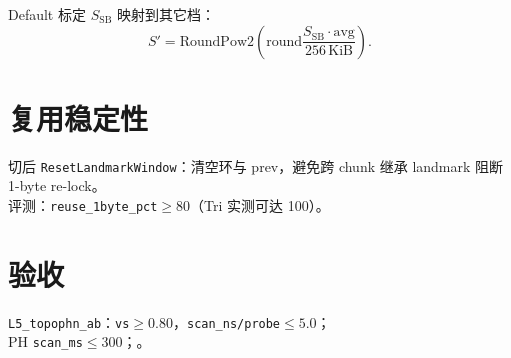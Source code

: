 Default 标定 $S_{\mathrm{SB}}$ 映射到其它档：
\begin{equation}
S'=\mathrm{RoundPow2}\!\left(\mathrm{round}\frac{S_{\mathrm{SB}}\cdot\mathrm{avg}}{256\,\mathrm{KiB}}\right).
\end{equation}

\section{复用稳定性}

切后 \texttt{ResetLandmarkWindow}：清空环与 prev，避免跨 chunk 继承 landmark 阻断 1-byte re-lock。\\
评测：\texttt{reuse\_1byte\_pct}$\ge80$（Tri 实测可达 100）。

\section{验收}

\texttt{L5\_topophn\_ab}：\texttt{vs}$\ge0.80$，\texttt{scan\_ns/probe}$\le5.0$；\\
PH \texttt{scan\_ms}$\le300$；。
